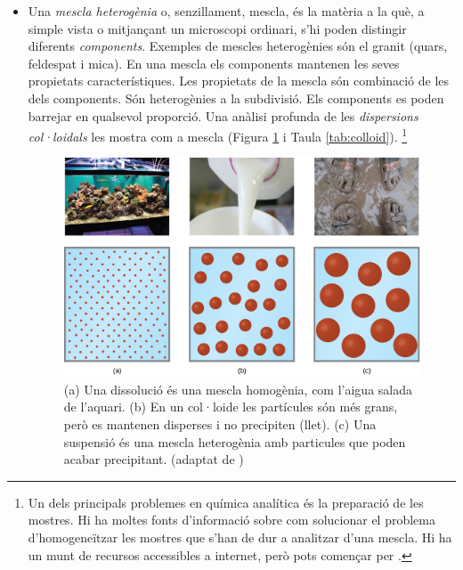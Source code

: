 \begin{itemize}
\item Una \emph{mescla heterogènia} o, senzillament, mescla, és la matèria a la què, a simple vista o mitjançant un microscopi ordinari, s'hi poden distingir diferents \emph{components}. Exemples de mescles heterogènies són el granit (quars, feldespat i mica). En una mescla els components mantenen les seves propietats característiques. Les propietats de la mescla són combinació de les dels components. Són heterogènies a la subdivisió. Els components es poden barrejar en qualsevol proporció. Una anàlisi profunda de les \emph{dispersions col·loidals} les mostra com a mescla (Figura \ref{fig:Colloid} i Taula \ref{tab:colloid}). \footnote{Un dels principals problemes en química analítica és la preparació de les mostres. Hi ha moltes fonts d'informació sobre com solucionar el problema d'homogeneïtzar les mostres que s'han de dur a analitzar d'una mescla. Hi ha un munt de recursos accessibles a internet, però pots començar per .}
\begin{figure}[h]
\centering
\includegraphics[scale=0.8]{figures/Colloid.png}
\caption[Dissolucions, suspensions i col·loides]{(a) Una dissolució és una mescla homogènia, com l'aigua salada de l'aquari. (b) En un col·loide les partícules són més grans, però es mantenen disperses i no precipiten (llet). (c) Una suspensió és una mescla heterogènia amb particules que poden acabar precipitant. (adaptat de \cite{fernandez-nieves_fluids_2016})}
\label{fig:Colloid}
\end{figure}


\end{itemize}
